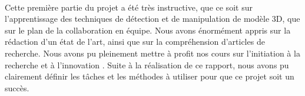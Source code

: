 \paragraph{}
Cette première partie du projet a été très instructive, que ce soit sur l'apprentissage des techniques de détection et de manipulation
de modèle 3D, que sur le plan de la collaboration en équipe. Nous avons énormément appris sur la rédaction d'un
état de l'art, ainsi que sur la compréhension d'articles de recherche. Nous avons pu pleinement mettre à profit
nos cours sur \og l'initiation à la recherche et à l'innovation \fg. Suite à la réalisation de ce rapport, nous avons pu
clairement définir les tâches et les méthodes à utiliser pour que ce projet soit un succès. 
